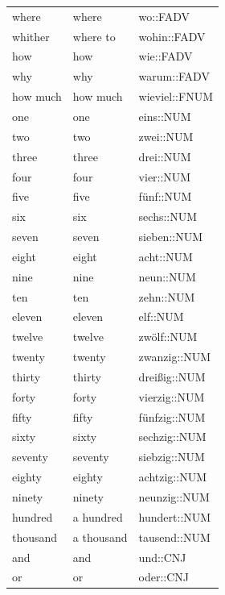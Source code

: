 \begin{center}
\begin{longtable}{lll}
{\sc \lowercase{	WHERE	}}	&	where		&	wo::FADV	\\
{\sc \lowercase{	WHITHER	}}	&	where to		&	wohin::FADV	\\
{\sc \lowercase{	HOW	}}	&	how		&	wie::FADV	\\
{\sc \lowercase{	WHY	}}	&	why		&	warum::FADV	\\
{\sc \lowercase{	HOW MUCH	}}	&	how much		&	wieviel::FNUM	\\
{\sc \lowercase{	ONE	}}	&	one		&	eins::NUM	\\
{\sc \lowercase{	TWO	}}	&	two		&	zwei::NUM	\\
{\sc \lowercase{	THREE	}}	&	three		&	drei::NUM	\\
{\sc \lowercase{	FOUR	}}	&	four		&	vier::NUM	\\
{\sc \lowercase{	FIVE	}}	&	five		&	fünf::NUM	\\
{\sc \lowercase{	SIX	}}	&	six		&	sechs::NUM	\\
{\sc \lowercase{	SEVEN	}}	&	seven		&	sieben::NUM	\\
{\sc \lowercase{	EIGHT	}}	&	eight		&	acht::NUM	\\
{\sc \lowercase{	NINE	}}	&	nine		&	neun::NUM	\\
{\sc \lowercase{	TEN	}}	&	ten		&	zehn::NUM	\\
{\sc \lowercase{	ELEVEN	}}	&	eleven		&	elf::NUM	\\
{\sc \lowercase{	TWELVE	}}	&	twelve		&	zwölf::NUM	\\
{\sc \lowercase{	TWENTY	}}	&	twenty		&	zwanzig::NUM	\\
{\sc \lowercase{	THIRTY	}}	&	thirty		&	dreißig::NUM	\\
{\sc \lowercase{	FORTY	}}	&	forty		&	vierzig::NUM	\\
{\sc \lowercase{	FIFTY	}}	&	fifty		&	fünfzig::NUM	\\
{\sc \lowercase{	SIXTY	}}	&	sixty		&	sechzig::NUM	\\
{\sc \lowercase{	SEVENTY	}}	&	seventy		&	siebzig::NUM	\\
{\sc \lowercase{	EIGHTY	}}	&	eighty		&	achtzig::NUM	\\
{\sc \lowercase{	NINETY	}}	&	ninety		&	neunzig::NUM	\\
{\sc \lowercase{	HUNDRED	}}	&	a hundred		&	hundert::NUM	\\
{\sc \lowercase{	THOUSAND	}}	&	a thousand		&	tausend::NUM	\\
{\sc \lowercase{	AND	}}	&	and		&	und::CNJ	\\
{\sc \lowercase{	OR	}}	&	or		&	oder::CNJ	\\

\end{longtable}
\end{center}

